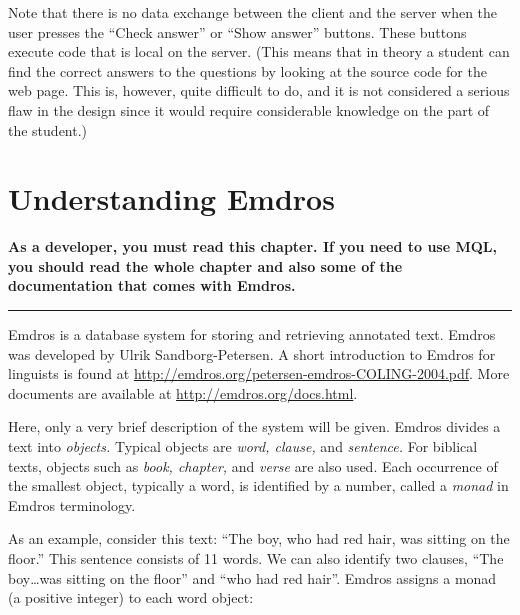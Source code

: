 \documentclass[11pt,oneside,a4paper]{memoir}
\begin{document}
Note that there is no data exchange between the client and the server when the user presses the
``Check answer'' or ``Show answer''%
buttons. These buttons execute code that is local on the server. (This means that in theory a
student can find the correct answers to the questions by looking at the source code for the web
page. This is, however, quite difficult to do, and it is not considered a serious flaw in the design
since it would require considerable knowledge on the part of the student.)


\chapter{Understanding Emdros}\label{chap-emdros-use}

\textbf{As a developer, you must read this chapter. If you need to use MQL, you should read the
  whole chapter and also some of the documentation that comes with Emdros.}

\plainbreak{3}

Emdros is a database system for storing and retrieving annotated text. Emdros was developed by Ulrik
Sandborg-Petersen. A short introduction to Emdros for linguists is
found at \url{http://emdros.org/petersen-emdros-COLING-2004.pdf}. More documents are available at
\url{http://emdros.org/docs.html}.

Here, only a very brief description of the system will be given. Emdros divides a text into
\emph{objects.} Typical objects are \emph{word, clause,} and
\emph{sentence.} For biblical texts, objects such as \emph{book, chapter,} and \emph{verse} are also
used. Each occurrence of the smallest object, typically a word, is identified by a number, called a
\emph{monad} in Emdros terminology.

As an example, consider this text: ``The boy, who had red hair, was sitting on the floor.'' This
sentence consists of 11 words. We can also identify two clauses, ``The boy\ldots was sitting on the
floor'' and ``who had red hair''. Emdros assigns a monad (a positive integer) to each word object:
\end{document}
